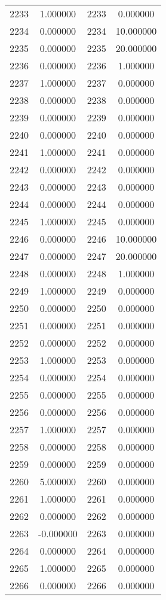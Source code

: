 \documentclass[12pt]{article}
\begin{document}
\begin{longtable}{@{}cccc@{}}
2233 & 1.000000 & 2233 & 0.000000 \\
2234 & 0.000000 & 2234 & 10.000000 \\
2235 & 0.000000 & 2235 & 20.000000 \\
2236 & 0.000000 & 2236 & 1.000000 \\
2237 & 1.000000 & 2237 & 0.000000 \\
2238 & 0.000000 & 2238 & 0.000000 \\
2239 & 0.000000 & 2239 & 0.000000 \\
2240 & 0.000000 & 2240 & 0.000000 \\
2241 & 1.000000 & 2241 & 0.000000 \\
2242 & 0.000000 & 2242 & 0.000000 \\
2243 & 0.000000 & 2243 & 0.000000 \\
2244 & 0.000000 & 2244 & 0.000000 \\
2245 & 1.000000 & 2245 & 0.000000 \\
2246 & 0.000000 & 2246 & 10.000000 \\
2247 & 0.000000 & 2247 & 20.000000 \\
2248 & 0.000000 & 2248 & 1.000000 \\
2249 & 1.000000 & 2249 & 0.000000 \\
2250 & 0.000000 & 2250 & 0.000000 \\
2251 & 0.000000 & 2251 & 0.000000 \\
2252 & 0.000000 & 2252 & 0.000000 \\
2253 & 1.000000 & 2253 & 0.000000 \\
2254 & 0.000000 & 2254 & 0.000000 \\
2255 & 0.000000 & 2255 & 0.000000 \\
2256 & 0.000000 & 2256 & 0.000000 \\
2257 & 1.000000 & 2257 & 0.000000 \\
2258 & 0.000000 & 2258 & 0.000000 \\
2259 & 0.000000 & 2259 & 0.000000 \\
2260 & 5.000000 & 2260 & 0.000000 \\
2261 & 1.000000 & 2261 & 0.000000 \\
2262 & 0.000000 & 2262 & 0.000000 \\
2263 & -0.000000 & 2263 & 0.000000 \\
2264 & 0.000000 & 2264 & 0.000000 \\
2265 & 1.000000 & 2265 & 0.000000 \\
2266 & 0.000000 & 2266 & 0.000000 \\

\end{longtable}
\end{document}
